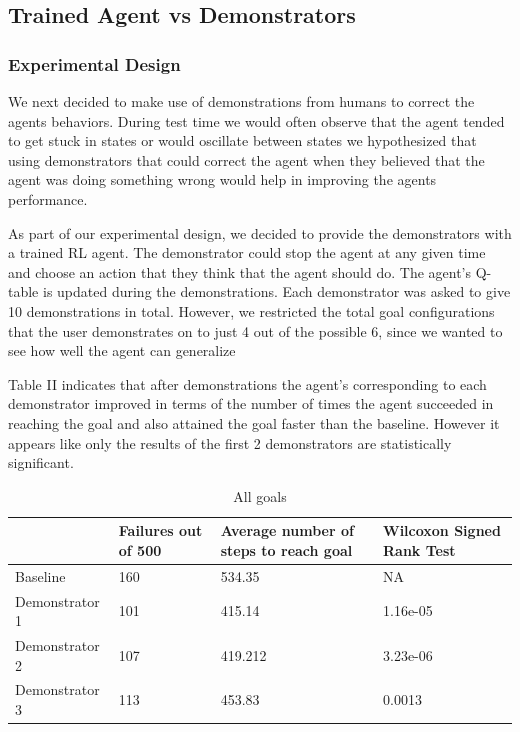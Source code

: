 \documentclass[letterpaper, 12 pt, conference]{ieeeconf}
\begin{document}
\subsection{Trained Agent vs Demonstrators}
\subsubsection{Experimental Design}
We next decided to make use of demonstrations from humans to correct the agents behaviors. During test time we would often observe that the agent tended to get stuck in states or would oscillate between states we hypothesized that using demonstrators that could correct the agent when they believed that the agent was doing something wrong would help in improving the agents performance.

As part of our experimental design, we decided to provide the demonstrators with a trained RL agent. The demonstrator could stop the agent at any given time and choose an action that they think that the agent should do. The agent’s Q-table is updated during the demonstrations. Each demonstrator was asked to give 10 demonstrations in total. However, we restricted the total goal configurations that the user demonstrates on to just 4 out of the possible 6, since we wanted to see how well the agent can generalize

Table II indicates that after demonstrations the agent's corresponding to each demonstrator improved in terms of the number of times the agent succeeded in reaching the goal and also attained the goal faster than the baseline. However it appears like only the results of the first 2 demonstrators are statistically significant.

\begin{table}[ht!]
    \caption{All goals}
    \begin{center}
        \begin{tabular}{|p{2cm}|p{1cm}|p{2cm}|p{2cm}|} 
            \hline
             & Failures out of 500 & Average number of steps to reach goal & Wilcoxon Signed Rank Test \\ \hline
            Baseline & 160 & 534.35 & NA \\  \hline
            Demonstrator 1 & 101 & 415.14 & 1.16e-05  \\  \hline
            Demonstrator 2 & 107 & 419.212 & 3.23e-06 \\  \hline
            Demonstrator 3 & 113 & 453.83 & 0.0013 \\ \hline
        \end{tabular}
    \end{center}
\end{table}
\end{document}
